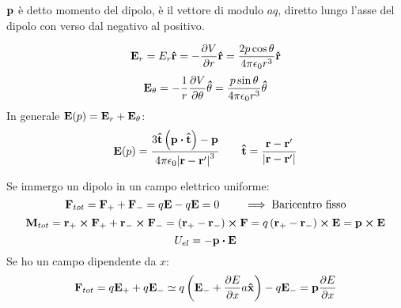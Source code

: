 \documentclass[12pt,a4paper]{article}
\begin{document}
\begin{definition}
    $\vb{p}$ è detto momento del dipolo, è il vettore di modulo $aq$, diretto lungo l'asse del dipolo con verso dal negativo al positivo.

\end{definition}

\begin{equation*}
    \vb{E}_r=E_r\vu{r}=-\pdv{V}{r}\vu{r}= \frac{2 p \cos \theta}{4\pi\epsilon_0r^3}\vu{r}
\end{equation*}
\begin{equation*}
    \vb{E}_\theta = -\frac{1}{r}\pdv{V}{\theta}\vu{\theta}= \frac{p \sin \theta}{4\pi\epsilon_0r^3}\vu{\theta}
\end{equation*}
In generale $\vb{E}(p)=\vb{E}_r+\vb{E}_\theta$:
\begin{equation*}
    \vb{E}(p)=\frac{3\vu{t}\left( \vb{p}\vdot\vu{t} \right)-\vb{p}}{4\pi\epsilon_0\abs{\vb{r}-\vb{r}'}^3} \quad \quad 
    \vu{t} = \frac{\vb{r}-\vb{r}'}{\abs{\vb{r}-\vb{r}'}}
\end{equation*}

Se immergo un dipolo in un campo elettrico uniforme:
\begin{equation*}
    \vb{F}_{tot} = \vb{F}_+ +\vb{F}_-= q\vb{E}-q\vb{E}=0  \quad \quad \implies \text{Baricentro fisso}
\end{equation*}
\begin{equation*}
    \vb{M}_{tot}= \vb{r}_+\cp\vb{F}_+ + \vb{r}_-\cp\vb{F}_-=\left( \vb{r}_+-\vb{r}_- \right) \cp\vb{F}=
     q\left( \vb{r}_+-\vb{r}_- \right) \cp\vb{E}= \vb{p}\cp\vb{E}
\end{equation*}
\begin{equation*}
    U_{el}= -\vb{p}\vdot\vb{E}
\end{equation*}
Se ho un campo dipendente da $x$:
\begin{equation*}
    \vb{F}_{tot} = q\vb{E}_+ +q\vb{E}_-\simeq q\left( \vb{E}_- + \pdv{E}{x}a\vu{x} \right)-q\vb{E}_-= \vb{p}\pdv{E}{x}
\end{equation*}
\end{document}
